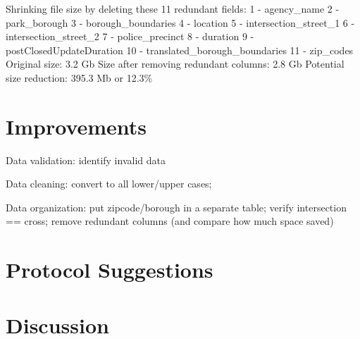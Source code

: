 \documentclass[12pt, titlepage]{article}
\begin{document}
Shrinking file size by deleting these 11 redundant fields:
     1 - agency\_name 
     2 - park\_borough 
     3 - borough\_boundaries 
     4 - location 
     5 - intersection\_street\_1 
     6 - intersection\_street\_2 
     7 - police\_precinct 
     8 - duration 
     9 - postClosedUpdateDuration 
     10 - translated\_borough\_boundaries 
     11 - zip\_codes 
Original size: 3.2 Gb 
Size after removing redundant columns: 2.8 Gb 
Potential size reduction: 395.3 Mb or 12.3\%



\section{Improvements} \label{sec:improvements}

Data validation: identify invalid data

Data cleaning: convert to all lower/upper cases;

Data organization: put zipcode/borough in a separate table; verify intersection
== cross; remove redundant columns (and compare how much space saved)



\section{Protocol Suggestions} \label{sec:protocol}



\section{Discussion} \label{sec:discussion}




\end{document}
